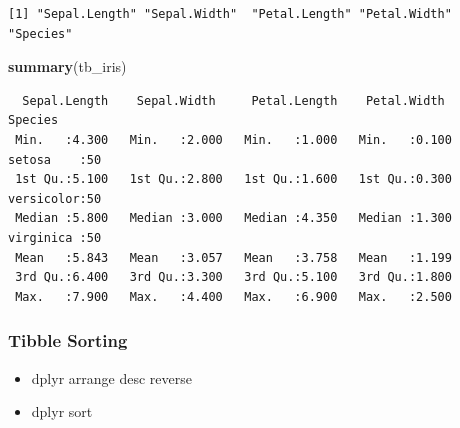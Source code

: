\documentclass[
]{book}
\newenvironment{Shaded}{\begin{snugshade}}{\end{snugshade}}
\newcommand{\CommentTok}[1]{\textcolor[rgb]{0.56,0.35,0.01}{\textit{#1}}}
\newcommand{\DecValTok}[1]{\textcolor[rgb]{0.00,0.00,0.81}{#1}}
\newcommand{\KeywordTok}[1]{\textcolor[rgb]{0.13,0.29,0.53}{\textbf{#1}}}
\newcommand{\NormalTok}[1]{#1}
\newcommand{\OperatorTok}[1]{\textcolor[rgb]{0.81,0.36,0.00}{\textbf{#1}}}
\newcommand{\StringTok}[1]{\textcolor[rgb]{0.31,0.60,0.02}{#1}}
\providecommand{\tightlist}{%
  \setlength{\itemsep}{0pt}\setlength{\parskip}{0pt}}
\begin{document}
\begin{verbatim}
[1] "Sepal.Length" "Sepal.Width"  "Petal.Length" "Petal.Width"  "Species"     
\end{verbatim}

\begin{Shaded}
\begin{Highlighting}[]
\KeywordTok{summary}\NormalTok{(tb_iris)}
\end{Highlighting}
\end{Shaded}

\begin{verbatim}
  Sepal.Length    Sepal.Width     Petal.Length    Petal.Width          Species  
 Min.   :4.300   Min.   :2.000   Min.   :1.000   Min.   :0.100   setosa    :50  
 1st Qu.:5.100   1st Qu.:2.800   1st Qu.:1.600   1st Qu.:0.300   versicolor:50  
 Median :5.800   Median :3.000   Median :4.350   Median :1.300   virginica :50  
 Mean   :5.843   Mean   :3.057   Mean   :3.758   Mean   :1.199                  
 3rd Qu.:6.400   3rd Qu.:3.300   3rd Qu.:5.100   3rd Qu.:1.800                  
 Max.   :7.900   Max.   :4.400   Max.   :6.900   Max.   :2.500                  
\end{verbatim}

\hypertarget{tibble-sorting}{%
\subsubsection{Tibble Sorting}\label{tibble-sorting}}

\begin{itemize}
\tightlist
\item
  dplyr arrange desc reverse
\item
  dplyr sort
\end{itemize}

\begin{Shaded}
\end{Shaded}
\end{document}
